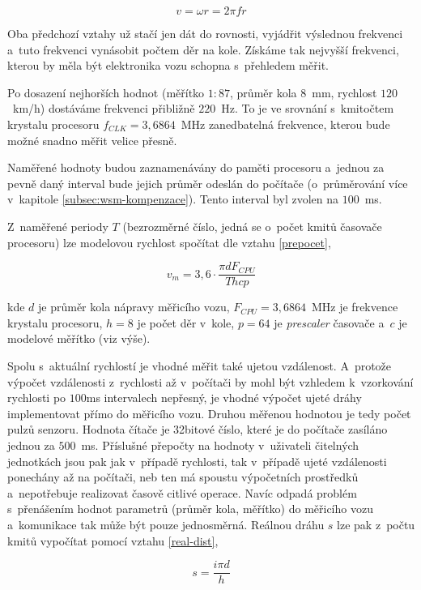 $$v = \omega r = 2 \pi f r$$

Oba předchozí vztahy už stačí jen dát do rovnosti, vyjádřit výslednou frekvenci
a~tuto frekvenci vynásobit počtem děr na kole. Získáme tak nejvyšší frekvenci,
kterou by měla být elektronika vozu schopna s~přehledem měřit.

Po dosazení nejhorších hodnot (měřítko $1:87$, průměr kola $8$~mm, rychlost
$120$~km/h) dostáváme frekvenci přibližně $220$~Hz. To je ve srovnání
s~kmitočtem krystalu procesoru $f_{CLK} = 3,6864$~MHz zanedbatelná frekvence,
kterou bude možné snadno měřit velice přesně.

Naměřené hodnoty budou zaznamenávány do paměti procesoru a~jednou za pevně daný
interval bude jejich průměr odeslán do počítače (o~průměrování více v~kapitole
\ref{subsec:wsm-kompenzace}). Tento interval byl zvolen na $100$~ms.

Z~naměřené periody $T$ (bezrozměrné číslo, jedná se o~počet kmitů časovače
procesoru) lze modelovou rychlost spočítat dle vztahu \ref{prepocet},

\begin{equation}
v_m = 3,6 \cdot \frac{\pi d F_{CPU}}{T h c p}
\label{prepocet}
\end{equation}

kde $d$ je průměr kola nápravy měřicího vozu, $F_{CPU} = 3,6864$~MHz je
frekvence krystalu procesoru, $h = 8$ je počet děr v~kole, $p = 64$ je
\textit{prescaler} časovače a~$c$ je modelové měřítko (viz výše).

Spolu s~aktuální rychlostí je vhodné měřit také ujetou vzdálenost. A~protože
výpočet vzdálenosti z~rychlosti až v~počítači by mohl být vzhledem k~vzorkování
rychlosti po $100$ms intervalech nepřesný, je vhodné výpočet ujeté dráhy
implementovat přímo do měřicího vozu. Druhou měřenou hodnotou je tedy počet
pulzů senzoru. Hodnota čítače je 32bitové číslo, které je do počítače zasíláno
jednou za $500$~ms. Příslušné přepočty na hodnoty v~uživateli čitelných
jednotkách jsou pak jak v~případě rychlosti, tak v~případě ujeté vzdálenosti
ponechány až na počítači, neb ten má spoustu výpočetních prostředků
a~nepotřebuje realizovat časově citlivé operace. Navíc odpadá problém
s~přenášením hodnot parametrů (průměr kola, měřítko) do měřicího vozu
a~komunikace tak může být pouze jednosměrná. Reálnou dráhu $s$ lze pak z~počtu
kmitů vypočítat pomocí vztahu \ref{real-dist},

\begin{equation}
s = \frac{i \pi d}{h}
\label{real-dist}
\end{equation}

